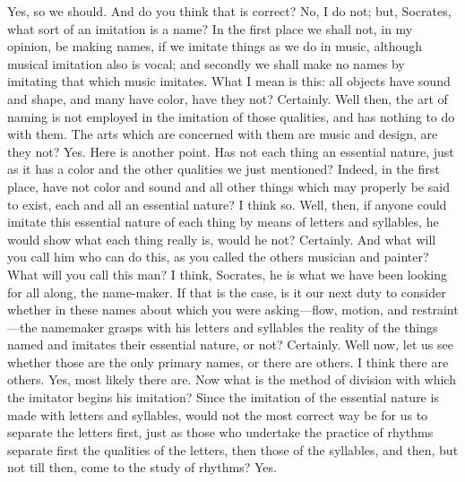 {{{{{\hermogenesspeaks
Yes, so we should.
\socratesspeaks
And do you think that is correct?
\hermogenesspeaks
No, I do not; but, Socrates, what sort of an imitation is a name?
\socratesspeaks
In the first place we shall not, in my opinion, be making names, if we imitate things as we do in music,  although musical imitation also is vocal; and secondly we shall make no names by imitating that which music imitates. What I mean is this: all objects have sound and shape, and many have color, have they not?
\hermogenesspeaks
Certainly.
\socratesspeaks
Well then, the art of naming is not employed in the imitation of those qualities, and has nothing to do with them. The arts which are concerned with them are music and design, are they not?
\hermogenesspeaks
Yes. 
\socratesspeaks
Here is another point. Has not each thing an essential nature, just as it has a color and the other qualities we just mentioned? Indeed, in the first place, have not color and sound and all other things which may properly be said to exist, each and all an essential nature?
\hermogenesspeaks
I think so.
\socratesspeaks
Well, then, if anyone could imitate this essential nature of each thing by means of letters and syllables, he would show what each thing really is, would he not? 
\hermogenesspeaks
Certainly.
\socratesspeaks
And what will you call him who can do this, as you called the others musician and painter? What will you call this man?
\hermogenesspeaks
I think, Socrates, he is what we have been looking for all along, the name-maker.
\socratesspeaks
If that is the case, is it our next duty to consider whether in these names about which you were asking—flow, motion, and restraint—the namemaker grasps with his letters and syllables the reality  of the things named and imitates their essential nature, or not?
\hermogenesspeaks
Certainly.
\socratesspeaks
Well now, let us see whether those are the only primary names, or there are others.
\hermogenesspeaks
I think there are others.
\socratesspeaks
Yes, most likely there are. Now what is the method of division with which the imitator begins his imitation? Since the imitation of the essential nature is made with letters and syllables, would not the most correct way be for us to separate the letters first,  just as those who undertake the practice of rhythms separate first the qualities of the letters, then those of the syllables, and then, but not till then, come to the study of rhythms?
\hermogenesspeaks
Yes.
\socratesspeaks
}}}}}
